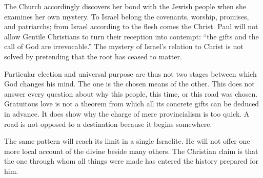 The Church accordingly discovers her bond with the Jewish people when she examines her own mystery. To Israel belong the covenants, worship, promises, and patriarchs; from Israel according to the flesh comes the Christ. Paul will not allow Gentile Christians to turn their reception into contempt: ``the gifts and the call of God are irrevocable.'' The mystery of Israel's relation to Christ is not solved by pretending that the root has ceased to matter.

Particular election and universal purpose are thus not two stages between which God changes his mind. The one is the chosen means of the other. This does not answer every question about why this people, this time, or this road was chosen. Gratuitous love is not a theorem from which all its concrete gifts can be deduced in advance. It does show why the charge of mere provincialism is too quick. A road is not opposed to a destination because it begins somewhere.

The same pattern will reach its limit in a single Israelite. He will not offer one more local account of the divine beside many others. The Christian claim is that the one through whom all things were made has entered the history prepared for him.
